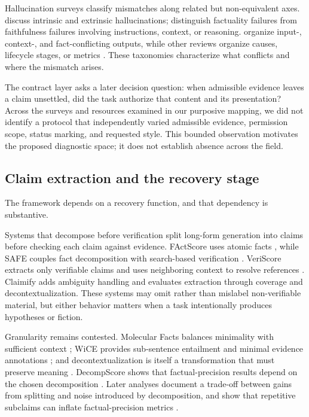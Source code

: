 \documentclass{clv2025}
\begin{document}
Hallucination surveys classify mismatches along related but non-equivalent
axes.
\citet{ji_survey_2023} discuss intrinsic and extrinsic hallucinations;
\citet{huang_survey_2025} distinguish factuality failures from
faithfulness failures involving instructions, context, or reasoning.
\citet{zhang_sirens_2025} organize input-, context-, and fact-conflicting
outputs, while other reviews organize causes, lifecycle stages, or metrics
\citep{wang_factuality_survey_2024,malin_faithfulness_review_2025,lamba_lifecycle_2026}.
These taxonomies characterize what conflicts and where the mismatch
arises.

The contract layer asks a later decision question: when admissible
evidence leaves a claim unsettled, did the task authorize that content and
its presentation?
Across the surveys and resources examined in our purposive mapping, we did
not identify a protocol that independently varied admissible evidence,
permission scope, status marking, and requested style.
This bounded observation motivates the proposed diagnostic space; it does
not establish absence across the field.

\subsection{Claim extraction and the recovery stage}\label{sec:extraction}

The framework depends on a recovery function, and that dependency is
substantive.

Systems that decompose before verification split long-form generation into claims before
checking each claim against evidence.
FActScore uses atomic facts \citep{min_factscore_2023}, while SAFE couples
fact decomposition with search-based verification
\citep{wei_longform_2024}.
VeriScore extracts only verifiable claims and uses neighboring context to
resolve references \citep{song_veriscore_2024}.
Claimify \citep{metropolitansky_claimify_2025} adds ambiguity handling and
evaluates extraction through coverage and decontextualization.
These systems may omit rather than mislabel non-verifiable material, but
either behavior matters when a task intentionally produces hypotheses or
fiction.

Granularity remains contested.
Molecular Facts balances minimality with sufficient context
\citep{gunjal_molecular_2024}; WiCE provides sub-sentence entailment and
minimal evidence annotations \citep{kamoi_wice_2023}; and
decontextualization is itself a transformation that must preserve meaning
\citep{choi_decontextualization_2021}.
DecompScore shows that factual-precision results depend on the chosen
decomposition \citep{wanner_closer_2024}.
Later analyses document a trade-off between gains from splitting and noise
introduced by decomposition, and show that repetitive subclaims can
inflate factual-precision metrics
\citep{hu_decomposition_2025,jiang_core_2025}.
\end{document}
